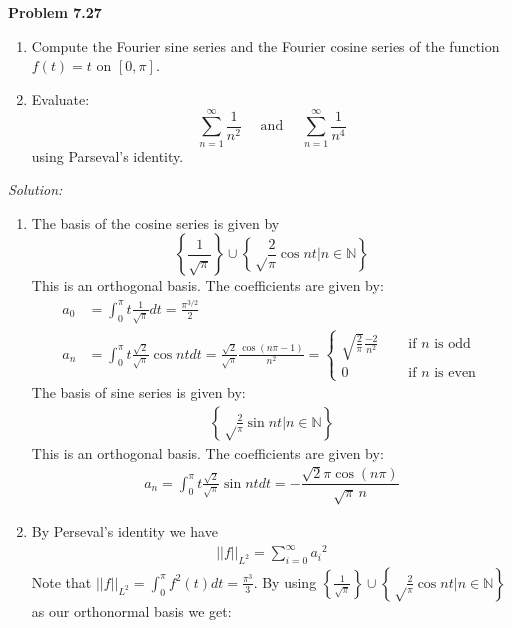 \documentclass[a4paper, 11pt]{article}
\newenvironment{problem}[2][Problem]
    { \begin{mdframed}[backgroundcolor=gray!20] \textbf{#1 #2} \\}
    {  \end{mdframed}}
\newenvironment{solution}
    {\textit{Solution:}}
    {}
\begin{document}
\begin{problem}{7.27}
    \begin{enumerate}
        \item Compute the Fourier sine series and the Fourier cosine series of the function $f(t) = t$ on $[0, \pi]$.
        \item Evaluate:
        $$\sum_{n=1}^\infty \frac{1}{n^2}\quad \text{ and } \quad \sum_{n=1}^\infty \frac{1}{n^4}$$
        using Parseval's identity.
    \end{enumerate}
\end{problem}
\begin{solution}
    \begin{enumerate}
        \item The basis of the cosine series is given by
        $$\left\{\frac{1}{\sqrt{\pi}}\right\}\cup \left\{\sqrt\frac{2}{{\pi}}\cos nt|n\in\mathbb N\right\}$$  
        This is an orthogonal basis. The coefficients are given by:
        \begin{align*}
            a_0&=\int_{0}^\pi t\frac{1}{\sqrt\pi}dt=\frac{\pi^{3/2}}{2}\\
            a_n&=\int_{0}^\pi  t\frac{\sqrt{2}}{\sqrt{\pi}}\cos ntdt=\frac{\sqrt2}{\sqrt\pi}\frac{\cos(n\pi-1)}{n^2}=\begin{cases}
                \sqrt{\frac{2}{\pi}}\frac{-2}{n^2}&\quad\text{ if }n\text{ is odd}\\
                0&\quad\text{ if }n\text{ is even}
            \end{cases}
        \end{align*}
        The basis of sine series is  given by:
        \begin{align*}
            \left\{\sqrt\frac{2}{{\pi}}\sin nt|n\in\mathbb N\right\}
        \end{align*}        
        This is an orthogonal basis. The coefficients are given by:
        \begin{align*}
            a_n=\int_{0}^\pi  t\frac{\sqrt{2}}{\sqrt{\pi}}\sin ntdt=-\dfrac{\sqrt{2}\pi\cos\left(n\pi\right)}{\sqrt{{\pi}}\,n}
        \end{align*}
    \item By Perseval's identity we have
    \begin{align*}
        ||f||_{L^2}=\sum_{i=0}^\infty{a_i}^2
    \end{align*}Note that $||f||_{L^2}=\int_0^\pi f^2(t)dt=\frac{\pi^3}{3}$. 
    By using $\left\{\frac{1}{\sqrt{\pi}}\right\}\cup \left\{\sqrt\frac{2}{{\pi}}\cos nt|n\in\mathbb N\right\}$ as our orthonormal basis we get:

\end{enumerate}
\end{solution}
\end{document}
